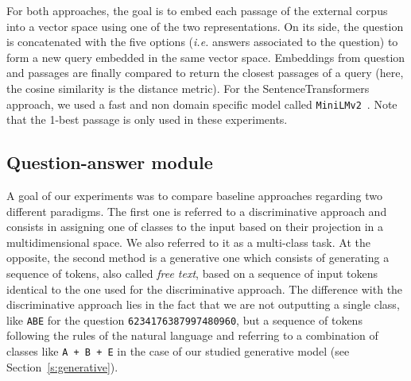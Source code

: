 \documentclass[11pt]{article}
\begin{document}
For both approaches, the goal is to embed each passage of the external corpus into a vector space using one of the two representations. On its side, the question is concatenated with the five options ({\it i.e.} answers associated to the question) to form a new query embedded in the same vector space. Embeddings from question and passages are finally compared to return the closest passages of a query (here, the cosine similarity is the distance metric). For the SentenceTransformers approach, we used a fast and non domain specific model called \texttt{MiniLMv2}~\cite{https://doi.org/10.48550/arxiv.2012.15828}. 
Note that the 1-best passage is only used in these experiments.

















































\subsection{Question-answer module}
\label{s:qa}

A goal of our experiments was to compare baseline approaches regarding two different paradigms. The first one is referred to a discriminative approach and consists in assigning one of  classes to the input based on their projection in a multidimensional space. We also referred to it as a multi-class task. At the opposite, the second method is  a generative one which consists of generating a sequence of tokens, also called {\it free text}, based on a sequence of input tokens identical to the one used for the discriminative approach. The difference with the discriminative approach lies in the fact that we are not outputting a single class, like \texttt{ABE} for the question \texttt{6234176387997480960}, but a sequence of tokens following the rules of the natural language and referring to a combination of classes like \texttt{A + B + E} in the case of our studied generative model (see Section~\ref{s:generative}).
\end{document}
